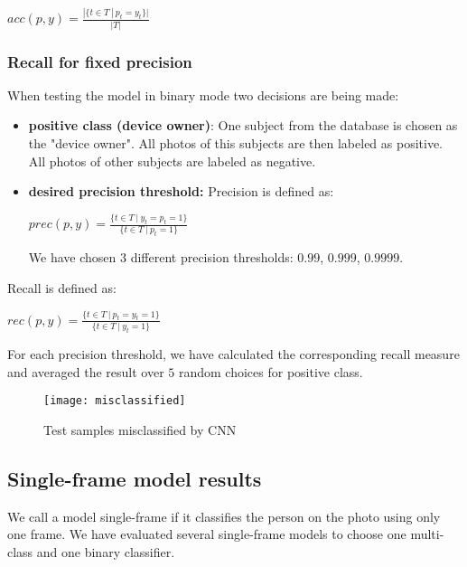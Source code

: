         \begin{center}
        $acc(p, y) = \frac{|\{t \in T\ |\ p_t = y_t\}|}{|T|}$
        \end{center}

        \subsubsection*{Recall for fixed precision}

        When testing the model in binary mode two decisions are being made:
        \begin{itemize}
            \item \textbf{positive class (device owner)}: One subject from the
            database is chosen as the "device owner". All photos of this subjects
            are then labeled as positive. All photos of other subjects are
            labeled as negative.
            \item \textbf{desired precision threshold:}
            Precision is defined as:
            \begin{center}
            $prec(p, y) = \frac{\{t \in T\ |\ y_t = p_t = 1\}}{\{t \in T\ |\ p_t = 1\}}$
            \end{center}
            We have chosen $3$ different precision thresholds: $0.99$, $0.999$, $0.9999$.
        \end{itemize}
        Recall is defined as:
        \begin{center}
        $rec(p, y) = \frac{\{t \in T\ |\ p_t = y_t = 1\}}{\{t \in T\ |\ y_t = 1\}}$
        \end{center}
        For each precision threshold, we have calculated the corresponding recall measure and
        averaged the result over $5$ random choices for positive class.

    \begin{figure}[H]
    \caption{Test samples misclassified by CNN}
    \centering
    \texttt{[image: misclassified]}
    \end{figure}


    \subsection{Single-frame model results}
        We call a model single-frame if it classifies the person on the photo
        using only one frame. We have evaluated several single-frame models to
        choose one multi-class and one binary classifier.
